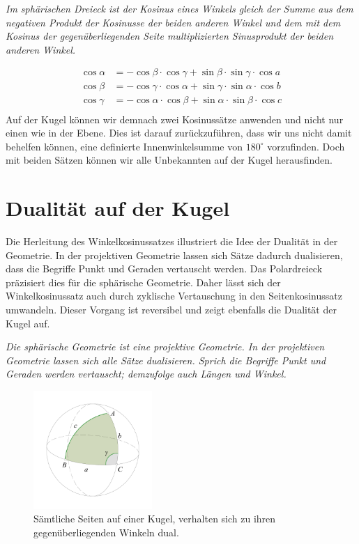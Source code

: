 \begin{refsection}
\begin{satz}\textit{Im sphärischen Dreieck ist der Kosinus eines Winkels gleich der Summe aus dem negativen Produkt der Kosinusse der beiden anderen Winkel und dem mit dem Kosinus der gegenüberliegenden Seite multiplizierten Sinusprodukt der beiden anderen Winkel.}
\label{skript:kugel:satz:Winkelkosinussatz}
\end{satz}
\begin{align*}
{\cos \alpha} &= {-\cos \beta} \cdot {\cos \gamma} + {\sin \beta} \cdot {\sin \gamma} \cdot {\cos a}\\
{\cos \beta} &= {-\cos \gamma} \cdot {\cos \alpha} + {\sin \gamma} \cdot {\sin \alpha} \cdot {\cos b}\\
{\cos \gamma} &= {-\cos \alpha} \cdot {\cos \beta} + {\sin \alpha} \cdot {\sin \beta} \cdot {\cos c}\\
\end{align*}
Auf der Kugel können wir demnach zwei Kosinussätze anwenden und nicht nur einen wie in der Ebene. Dies ist darauf zurückzuführen, dass wir uns nicht damit behelfen können, eine definierte Innenwinkelsumme von $180^{\circ}$ vorzufinden. Doch mit beiden Sätzen können wir alle Unbekannten auf der Kugel herausfinden.



\section{Dualität auf der Kugel}
Die Herleitung des Winkelkosinussatzes illustriert die Idee der Dualität in der Geometrie. In der projektiven Geometrie lassen sich Sätze dadurch dualisieren, dass die Begriffe Punkt und Geraden vertauscht werden. Das Polardreieck präzisiert dies für die sphärische Geometrie.
Daher lässt sich der Winkelkosinussatz auch durch zyklische Vertauschung in den Seitenkosinussatz umwandeln. Dieser Vorgang ist reversibel und zeigt ebenfalls die Dualität der Kugel auf.

\begin{satz}\textit{Die sphärische Geometrie ist eine projektive Geometrie. In der projektiven Geometrie lassen sich alle Sätze dualisieren. Sprich die Begriffe Punkt und Geraden werden vertauscht; demzufolge auch Längen und Winkel.}
\label{skript:kugel:satz:Dualitaet}
\end{satz}

\begin{figure}[htbp]
\centering
\includegraphics[width=0.4\textwidth]{kugel/Dualitaet.jpg}
\caption{Sämtliche Seiten auf einer Kugel, verhalten sich zu ihren gegenüberliegenden Winkeln dual.}
\end{figure}


\end{refsection}

